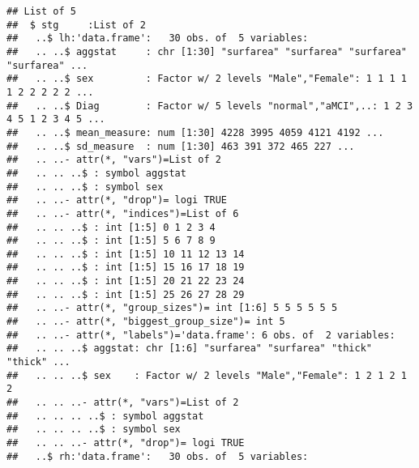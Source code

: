 \documentclass[12pt]{article}\usepackage[]{graphicx}\usepackage[]{color}
\makeatletter
\newenvironment{kframe}{%
 \def\at@end@of@kframe{}%
 \ifinner\ifhmode%
  \def\at@end@of@kframe{\end{minipage}}%
  \begin{minipage}{\columnwidth}%
 \fi\fi%
 \def\FrameCommand##1{\hskip\@totalleftmargin \hskip-\fboxsep
 \colorbox{shadecolor}{##1}\hskip-\fboxsep
     \hskip-\linewidth \hskip-\@totalleftmargin \hskip\columnwidth}%
 \MakeFramed {\advance\hsize-\width
   \@totalleftmargin\z@ \linewidth\hsize
   \@setminipage}}%
 {\par\unskip\endMakeFramed%
 \at@end@of@kframe}
\newenvironment{knitrout}{}{} %
\makeatother
\begin{document}
\begin{knitrout}
\color{fgcolor}\begin{kframe}


{\ttfamily\noindent\itshape\color{messagecolor}{\#\# Adding missing grouping variables: `aggstat`\\\#\# Adding missing grouping variables: `aggstat`\\\#\# Adding missing grouping variables: `aggstat`\\\#\# Adding missing grouping variables: `aggstat`\\\#\# Adding missing grouping variables: `aggstat`\\\#\# Adding missing grouping variables: `aggstat`\\\#\# Adding missing grouping variables: `aggstat`\\\#\# Adding missing grouping variables: `aggstat`\\\#\# Adding missing grouping variables: `aggstat`\\\#\# Adding missing grouping variables: `aggstat`}}\begin{verbatim}
## List of 5
##  $ stg     :List of 2
##   ..$ lh:'data.frame':	30 obs. of  5 variables:
##   .. ..$ aggstat     : chr [1:30] "surfarea" "surfarea" "surfarea" "surfarea" ...
##   .. ..$ sex         : Factor w/ 2 levels "Male","Female": 1 1 1 1 1 2 2 2 2 2 ...
##   .. ..$ Diag        : Factor w/ 5 levels "normal","aMCI",..: 1 2 3 4 5 1 2 3 4 5 ...
##   .. ..$ mean_measure: num [1:30] 4228 3995 4059 4121 4192 ...
##   .. ..$ sd_measure  : num [1:30] 463 391 372 465 227 ...
##   .. ..- attr(*, "vars")=List of 2
##   .. .. ..$ : symbol aggstat
##   .. .. ..$ : symbol sex
##   .. ..- attr(*, "drop")= logi TRUE
##   .. ..- attr(*, "indices")=List of 6
##   .. .. ..$ : int [1:5] 0 1 2 3 4
##   .. .. ..$ : int [1:5] 5 6 7 8 9
##   .. .. ..$ : int [1:5] 10 11 12 13 14
##   .. .. ..$ : int [1:5] 15 16 17 18 19
##   .. .. ..$ : int [1:5] 20 21 22 23 24
##   .. .. ..$ : int [1:5] 25 26 27 28 29
##   .. ..- attr(*, "group_sizes")= int [1:6] 5 5 5 5 5 5
##   .. ..- attr(*, "biggest_group_size")= int 5
##   .. ..- attr(*, "labels")='data.frame':	6 obs. of  2 variables:
##   .. .. ..$ aggstat: chr [1:6] "surfarea" "surfarea" "thick" "thick" ...
##   .. .. ..$ sex    : Factor w/ 2 levels "Male","Female": 1 2 1 2 1 2
##   .. .. ..- attr(*, "vars")=List of 2
##   .. .. .. ..$ : symbol aggstat
##   .. .. .. ..$ : symbol sex
##   .. .. ..- attr(*, "drop")= logi TRUE
##   ..$ rh:'data.frame':	30 obs. of  5 variables:

\end{verbatim}
\end{kframe}
\end{knitrout}
\end{document}
